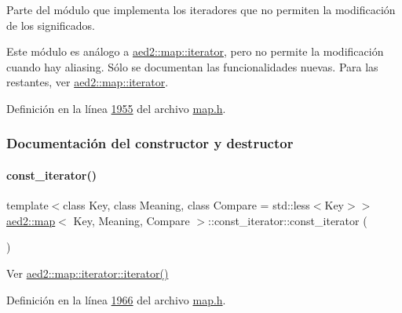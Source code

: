 Parte del módulo que implementa los iteradores que no permiten la modificación de los significados. 

Este módulo es análogo a \hyperlink{classaed2_1_1map_1_1iterator}{aed2\+::map\+::iterator}, pero no permite la modificación cuando hay aliasing. Sólo se documentan las funcionalidades nuevas. Para las restantes, ver \hyperlink{classaed2_1_1map_1_1iterator}{aed2\+::map\+::iterator}. 

Definición en la línea \hyperlink{map_8h_source_l01955}{1955} del archivo \hyperlink{map_8h_source}{map.\+h}.



\subsubsection{Documentación del constructor y destructor}
\mbox{\label{classaed2_1_1map_1_1const__iterator_a8add3e4cabbdaf313b0e085064491555_a8add3e4cabbdaf313b0e085064491555}} 
\paragraph{\texorpdfstring{const\+\_\+iterator()}{const\_iterator()}\hspace{0.1cm}{\footnotesize\ttfamily [1/3]}}
{\footnotesize\ttfamily template$<$class Key, class Meaning, class Compare = std\+::less$<$\+Key$>$$>$ \\
\hyperlink{classaed2_1_1map}{aed2\+::map}$<$ Key, Meaning, Compare $>$\+::const\+\_\+iterator\+::const\+\_\+iterator (\begin{DoxyParamCaption}{ }\end{DoxyParamCaption})\hspace{0.3cm}{\ttfamily [inline]}}



Ver \hyperlink{classaed2_1_1map_1_1iterator_acdd790eb54216601a2e0591776004dba_acdd790eb54216601a2e0591776004dba}{aed2\+::map\+::iterator\+::iterator()} 



Definición en la línea \hyperlink{map_8h_source_l01966}{1966} del archivo \hyperlink{map_8h_source}{map.\+h}.

